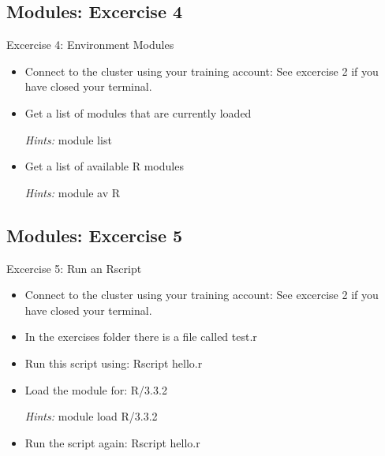 \subsection{Modules: Excercise 4}
\begin{frame}[fragile]{Excercise 4: Environment Modules}
\begin{itemize}
\item{Connect to the cluster using your training account: See excercise 2 if you have closed your terminal. }
\item{Get a list of modules that are currently loaded}
\item[\emph{Hints:}]{\alert{module list}}
\item{Get a list of available R modules}
\item[\emph{Hints:}]{\alert{module av R}}
\end{itemize}
\end{frame}

\subsection{Modules: Excercise 5}
\begin{frame}[fragile]{Excercise 5: Run an Rscript}
\begin{itemize}
\item{Connect to the cluster using your training account: See excercise 2 if you have closed your terminal. }
\item{In the exercises folder there is a file called test.r}
\item{Run this script using: Rscript hello.r }
\item{Load the module for: R/3.3.2}
\item[\emph{Hints:}]{\alert{module load R/3.3.2}}
\item{Run the script again: Rscript hello.r}
\end{itemize}
\end{frame}

